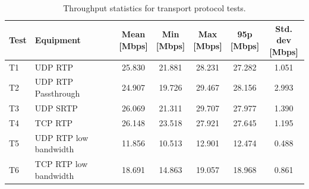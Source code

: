 \begin{table}[H]
    \centering
    \caption{Throughput statistics for transport protocol tests.}\label{tab:throughput_transport}
    \begin{tabular}{|l|l|c|c|c|c|c|}
    \hline
    \textbf{Test} & \textbf{Equipment} & \shortstack{\textbf{Mean}\\ \textbf{[Mbps]}}  & \shortstack{\textbf{Min}\\ \textbf{[Mbps]}} & \shortstack{\textbf{Max}\\ \textbf{[Mbps]}} & \shortstack{\textbf{95p}\\ \textbf{[Mbps]}} & \shortstack{\textbf{Std. dev}\\ \textbf{[Mbps]}}\\
    \hline
    T1 & UDP RTP & 25.830 & 21.881 & 28.231 & 27.282 & 1.051\\
    \hline
    T2 & UDP RTP Passthrough & 24.907 & 19.726 & 29.467 & 28.156 & 2.993  \\
    \hline
    T3 & UDP SRTP & 26.069 & 21.311 & 29.707 & 27.977 & 1.390\\
    \hline
    T4 & TCP RTP & 26.148 & 23.518 & 27.921 & 27.645 & 1.195\\
    \hline
    T5 & UDP RTP low bandwidth & 11.856 & 10.513 & 12.901 & 12.474 & 0.488\\
    \hline
    T6 & TCP RTP low bandwidth & 18.691 & 14.863 & 19.057 & 18.968 & 0.861\\
    \hline
    \end{tabular}
\end{table}
